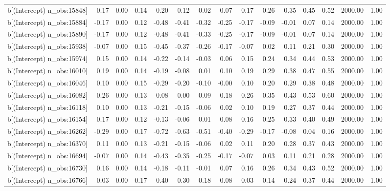 \begin{table}[ht]
\begin{tabular}{rrrrrrrrrrrrrrr}
  b[(Intercept) n\_obs:15848] & 0.17 & 0.00 & 0.14 & -0.20 & -0.12 & -0.02 & 0.07 & 0.17 & 0.26 & 0.35 & 0.45 & 0.52 & 2000.00 & 1.00 \\ 
  b[(Intercept) n\_obs:15884] & -0.17 & 0.00 & 0.12 & -0.48 & -0.41 & -0.32 & -0.25 & -0.17 & -0.09 & -0.01 & 0.07 & 0.14 & 2000.00 & 1.00 \\ 
  b[(Intercept) n\_obs:15890] & -0.17 & 0.00 & 0.12 & -0.48 & -0.41 & -0.33 & -0.25 & -0.17 & -0.09 & -0.01 & 0.07 & 0.14 & 2000.00 & 1.00 \\ 
  b[(Intercept) n\_obs:15938] & -0.07 & 0.00 & 0.15 & -0.45 & -0.37 & -0.26 & -0.17 & -0.07 & 0.02 & 0.11 & 0.21 & 0.30 & 2000.00 & 1.00 \\ 
  b[(Intercept) n\_obs:15974] & 0.15 & 0.00 & 0.14 & -0.22 & -0.14 & -0.03 & 0.06 & 0.15 & 0.24 & 0.34 & 0.44 & 0.53 & 2000.00 & 1.00 \\ 
  b[(Intercept) n\_obs:16010] & 0.19 & 0.00 & 0.14 & -0.19 & -0.08 & 0.01 & 0.10 & 0.19 & 0.29 & 0.38 & 0.47 & 0.55 & 2000.00 & 1.00 \\ 
  b[(Intercept) n\_obs:16046] & 0.10 & 0.00 & 0.15 & -0.29 & -0.20 & -0.10 & -0.00 & 0.10 & 0.20 & 0.29 & 0.38 & 0.48 & 2000.00 & 1.00 \\ 
  b[(Intercept) n\_obs:16082] & 0.26 & 0.00 & 0.13 & -0.08 & 0.00 & 0.09 & 0.18 & 0.26 & 0.35 & 0.43 & 0.53 & 0.60 & 2000.00 & 1.00 \\ 
  b[(Intercept) n\_obs:16118] & 0.10 & 0.00 & 0.13 & -0.21 & -0.15 & -0.06 & 0.02 & 0.10 & 0.19 & 0.27 & 0.37 & 0.44 & 2000.00 & 1.00 \\ 
  b[(Intercept) n\_obs:16154] & 0.17 & 0.00 & 0.12 & -0.13 & -0.06 & 0.01 & 0.08 & 0.16 & 0.25 & 0.33 & 0.40 & 0.49 & 2000.00 & 1.00 \\ 
  b[(Intercept) n\_obs:16262] & -0.29 & 0.00 & 0.17 & -0.72 & -0.63 & -0.51 & -0.40 & -0.29 & -0.17 & -0.08 & 0.04 & 0.16 & 2000.00 & 1.00 \\ 
  b[(Intercept) n\_obs:16370] & 0.11 & 0.00 & 0.13 & -0.21 & -0.15 & -0.06 & 0.02 & 0.11 & 0.20 & 0.28 & 0.37 & 0.43 & 2000.00 & 1.00 \\ 
  b[(Intercept) n\_obs:16694] & -0.07 & 0.00 & 0.14 & -0.43 & -0.35 & -0.25 & -0.17 & -0.07 & 0.03 & 0.11 & 0.21 & 0.28 & 2000.00 & 1.00 \\ 
  b[(Intercept) n\_obs:16730] & 0.16 & 0.00 & 0.14 & -0.18 & -0.11 & -0.01 & 0.07 & 0.16 & 0.26 & 0.34 & 0.43 & 0.52 & 2000.00 & 1.00 \\ 
  b[(Intercept) n\_obs:16766] & 0.03 & 0.00 & 0.17 & -0.40 & -0.30 & -0.18 & -0.08 & 0.03 & 0.14 & 0.24 & 0.37 & 0.44 & 2000.00 & 1.00 \\ 

\end{tabular}
\end{table}
